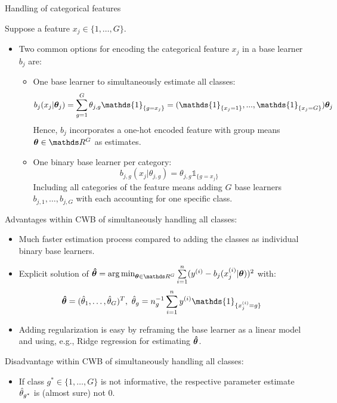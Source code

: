 \documentclass[11pt,compress,t,notes=noshow, xcolor=table]{beamer}
\begin{document}
\begin{vbframe}{Handling of categorical features}

Suppose a feature $x_j \in \{1, \dots, G\}$.
\begin{itemize}
  \item Two common options for encoding the categorical feature $x_j$ in a base learner $b_j$ are:
  \begin{itemize}
    \item 
        One base learner to simultaneously estimate all classes: 
        $$b_j(x_j | \thetab_j) = \sum_{g=1}^G \theta_{j,g}\mathds{1}_{\{g = x_j\}} = (\mathds{1}_{\{x_j = 1\}}, ..., \mathds{1}_{\{x_j = G\}}) \thetab_j$$
        Hence, $b_j$ incorporates a one-hot encoded feature with group means $\thetab\in\R^G$ as estimates. 
    
    \item 
        One binary base learner per category:
        $$b_{j,g}(x_j | \theta_{j,g}) = \theta_{j,g}\mathds{1}_{\{g = x_j\}}$$  
        Including all categories of the feature means adding $G$ base learners $b_{j,1}, \dots, b_{j,G}$ with each accounting for one specific class.
  \end{itemize}
\end{itemize}

\framebreak

Advantages within CWB of simultaneously handling all classes: 
\begin{itemize}
    \item 
        Much faster estimation process compared to adding the classes as individual binary base learners.

    \item 
        Explicit solution of $\thetabh = \argmin_{\thetab\in\R^G}\sumin (\yi - b_j(x^{(i)}_j | \thetab))^2$ with:
        $$\thetabh = (\thetah_1, \dots, \thetah_G)^T,\ \thetah_g = n_g^{-1}\sumin \yi \mathds{1}_{\{x^{(i)}_j = g\}}$$

    \item 
        Adding regularization is easy by reframing the base learner as a linear model and using, e.g., Ridge regression for estimating $\bm{\hat\theta}$.  
\end{itemize}

Disadvantage within CWB of simultaneously handling all classes: 
\begin{itemize}
    \item 
        If class $g^\ast\in\{1, \dots, G\}$ is not informative, the respective parameter estimate $\hat{\theta}_{g^\ast}$ is (almost sure) not $0$.
\end{itemize}


\end{vbframe}
\end{document}
